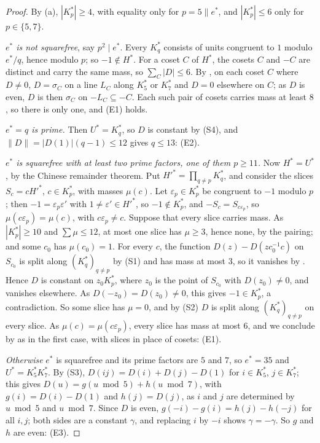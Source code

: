 \begin{proof}
By (a), $|K^{*}_{p}|\ge4$, with equality only for
$p=5\parallel e^{*}$, and $|K^{*}_{p}|\le6$ only for $p\in\{5,7\}$.

\emph{$e^{*}$ is not squarefree}, say $p^{2}\mid e^{*}$. Every $K^{*}_{q}$
consists of units congruent to $1$ modulo $e^{*}/q$, hence modulo $p$; so
$-1\notin H^{*}$. For a coset $C$ of $H^{*}$, the cosets $C$ and $-C$ are
distinct and carry the same mass, so $\sum_{C}|D|\le6$. By ,
on each coset $C$ where $D\ne0$, $D=\sigma_{C}$ on a line $L_{C}$ along
$K^{*}_{5}$ or $K^{*}_{7}$ and $D=0$ elsewhere on $C$; as $D$ is even, $D$ is
then $\sigma_{C}$ on $-L_{C}\subseteq-C$. Each such pair of cosets carries
mass at least $8$, so there is only one, and (E1) holds.

\emph{$e^{*}=q$ is prime.} Then $U^{*}=K^{*}_{q}$, so $D$ is constant by
(S4), and $\|D\|=|D(1)|(q-1)\le12$ gives $q\le13$: (E2).

\emph{$e^{*}$ is squarefree with at least two prime factors, one of them
$p\ge11$.} Now $H^{*}=U^{*}$, by the Chinese remainder theorem. Put
$H'^{*}=\prod_{q\ne p}K^{*}_{q}$, and consider the slices $S_{c}=cH'^{*}$,
$c\in K^{*}_{p}$, with masses $\mu(c)$. Let $\varepsilon_{p}\in K^{*}_{p}$
be congruent to $-1$ modulo $p$; then $-1=\varepsilon_{p}\varepsilon'$ with
$1\ne\varepsilon'\in H'^{*}$, so $-1\notin K^{*}_{p}$, and $-S_{c}=
S_{c\varepsilon_{p}}$, so $\mu(c\varepsilon_{p})=\mu(c)$, with
$c\varepsilon_{p}\ne c$. Suppose that every slice carries mass. As
$|K^{*}_{p}|\ge10$ and $\sum\mu\le12$, at most one slice has $\mu\ge3$, hence
none, by the pairing; and some $c_{0}$ has $\mu(c_{0})=1$. For every $c$, the
function $D(z)-D(zc_{0}^{-1}c)$ on $S_{c_{0}}$ is split along
$(K^{*}_{q})_{q\ne p}$ by (S1) and has mass at most $3$, so it vanishes by
. Hence $D$ is constant on $z_{0}K^{*}_{p}$, where $z_{0}$ is
the point of $S_{c_{0}}$ with $D(z_{0})\ne0$, and vanishes elsewhere. As
$D(-z_{0})=D(z_{0})\ne0$, this gives $-1\in K^{*}_{p}$, a contradiction. So
some slice has $\mu=0$, and by (S2) $D$ is split along $(K^{*}_{q})_{q\ne p}$
on every slice. As $\mu(c)=\mu(c\varepsilon_{p})$, every slice has mass at
most $6$, and we conclude by  as in the first case, with
slices in place of cosets: (E1).

\emph{Otherwise} $e^{*}$ is squarefree and its prime factors are $5$ and
$7$, so $e^{*}=35$ and $U^{*}=K^{*}_{5}K^{*}_{7}$. By (S3),
$D(ij)=D(i)+D(j)-D(1)$ for $i\in K^{*}_{5}$, $j\in K^{*}_{7}$; this gives
$D(u)=g(u\bmod5)+h(u\bmod7)$, with $g(i)=D(i)-D(1)$ and $h(j)=D(j)$, as $i$
and $j$ are determined by $u\bmod5$ and $u\bmod7$. Since $D$ is even,
$g(-i)-g(i)=h(j)-h(-j)$ for all $i,j$; both sides are a constant $\gamma$,
and replacing $i$ by $-i$ shows $\gamma=-\gamma$. So $g$ and $h$ are even:
(E3).
\end{proof}

